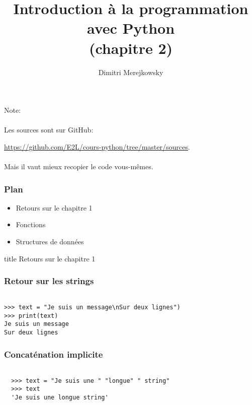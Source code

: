 \documentclass{beamer}
\title{Introduction à la programmation avec Python \\ (chapitre 2)}
\author{Dimitri Merejkowsky}
\institute{E2L}
\begin{document}
\frame{\titlepage}

\begin{frame}

Note: \\~\\

Les sources sont sur GitHub:

\url{https://github.com/E2L/cours-python/tree/master/sources}. \\~\\


Mais il vaut mieux recopier le code vous-mêmes.

\end{frame}


\begin{frame}

\frametitle{Plan}

\begin{itemize}
  \item Retours sur le chapitre 1
  \item Fonctions
  \item Structures de données
\end{itemize}

\end{frame}

\begin{frame}[fragile]
  \centering
  \begin{beamercolorbox}[sep=8pt,center,shadow=true,rounded=true]{title}
    Retours sur le chapitre 1
  \end{beamercolorbox}
\end{frame}

\begin{frame}[fragile]
  \frametitle{Retour sur les strings}

\begin{lstlisting}

>>> text = "Je suis un message\nSur deux lignes")
>>> print(text)
Je suis un message
Sur deux lignes
\end{lstlisting}

\end{frame}

\begin{frame}[fragile]
  \frametitle{Concaténation implicite}

\begin{lstlisting}

  >>> text = "Je suis une " "longue" " string"
  >>> text
  'Je suis une longue string'
\end{lstlisting}

\end{frame}
\end{document}
